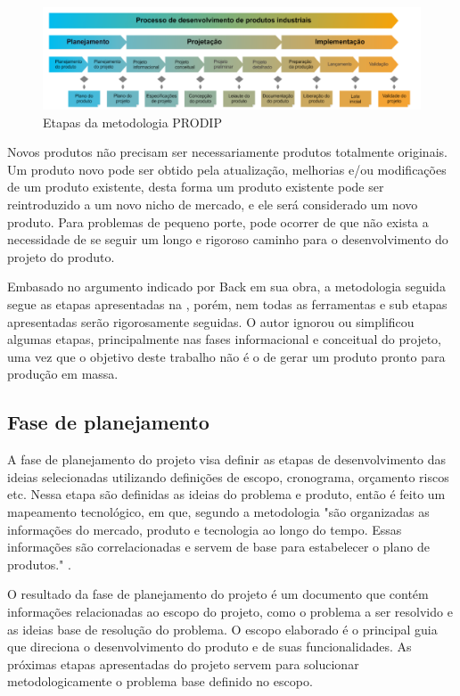 \begin{figure}[htb]
	\caption{\label{fig:1170}Etapas da metodologia PRODIP}
	\begin{center}
		\includegraphics[width=\textwidth]{pictures/1170.png}
	\end{center}
\end{figure}

Novos produtos não precisam ser necessariamente produtos totalmente originais. Um produto novo pode ser obtido pela atualização, melhorias e/ou modificações de um produto
existente, desta forma um produto existente pode ser reintroduzido a um novo nicho de mercado, e ele será considerado um novo produto. Para problemas de pequeno porte, pode
ocorrer de que não exista a necessidade de se seguir um longo e rigoroso caminho para o desenvolvimento do projeto do produto. \autocite{Back2008}

Embasado no argumento indicado por Back em sua obra, a metodologia seguida segue as etapas apresentadas na \autocite{PRODIP}, porém, nem todas as ferramentas e sub etapas
apresentadas serão rigorosamente seguidas. O autor ignorou ou simplificou algumas etapas, principalmente nas fases informacional e conceitual do projeto, uma vez que o
objetivo deste trabalho não é o de gerar um produto pronto para produção em massa.

\subsection{Fase de planejamento}

A fase de planejamento do projeto visa definir as etapas de desenvolvimento das ideias selecionadas utilizando definições de escopo, cronograma, orçamento riscos etc.
Nessa etapa são definidas as ideias do problema e produto, então é feito um mapeamento tecnológico, em que, segundo a metodologia "são organizadas as informações do mercado,
produto e tecnologia ao longo do tempo.  Essas informações são correlacionadas e servem de base para estabelecer o plano de produtos." \autocite{PRODIP}.

O resultado da fase de planejamento do projeto é um documento que contém informações relacionadas ao escopo do projeto, como o problema a ser resolvido e as ideias base de
resolução do problema. O escopo elaborado é o principal guia que direciona o desenvolvimento do produto e de suas funcionalidades. As próximas etapas apresentadas do projeto
servem para solucionar metodologicamente o problema base definido no escopo.

